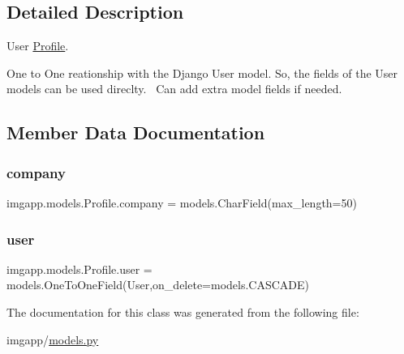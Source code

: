 \subsection{Detailed Description}
User \hyperlink{classimgapp_1_1models_1_1Profile}{Profile}. 

One to One reationship with the Django User model. So, the fields of the User models can be used direclty.~\newline
 Can add extra model fields if needed. 

\subsection{Member Data Documentation}
\mbox{\label{classimgapp_1_1models_1_1Profile_a7204f3b8cc0278caf80fab184397f7ae}} 
\subsubsection{\texorpdfstring{company}{company}}
{\footnotesize\ttfamily imgapp.\+models.\+Profile.\+company = models.\+Char\+Field(max\+\_\+length=50)\hspace{0.3cm}{\ttfamily [static]}}

\mbox{\label{classimgapp_1_1models_1_1Profile_a42a93bae8e707591dbd2eea4f5f2cb28}} 
\subsubsection{\texorpdfstring{user}{user}}
{\footnotesize\ttfamily imgapp.\+models.\+Profile.\+user = models.\+One\+To\+One\+Field(User,on\+\_\+delete=models.\+C\+A\+S\+C\+A\+DE)\hspace{0.3cm}{\ttfamily [static]}}



The documentation for this class was generated from the following file\+:\begin{DoxyCompactItemize}
\item 
imgapp/\hyperlink{models_8py}{models.\+py}\end{DoxyCompactItemize}
